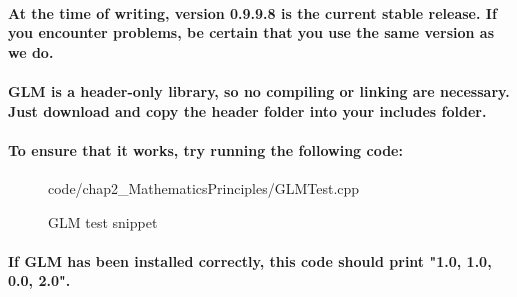 \paragraph{
    At the time of writing, version 0.9.9.8 is the current stable release. If you encounter problems, be certain that you use the same version as we do.
}

\paragraph{
    GLM is a header-only library, so no compiling or linking are necessary. Just download and copy the header folder into your includes folder.
}

\paragraph{
    To ensure that it works, try running the following code:
}

\begin{frame}{}
    \begin{figure}[ht]
    \centering
    \colorbox{backgroundcolor}{
        \parbox{0.9\textwidth}{
            
            {code/chap2_MathematicsPrinciples/GLMTest.cpp}
        }
    }
    \caption{GLM test snippet}
    \label{fig:glm_snippet}
    \end{figure}
\end{frame}

\paragraph{
    If GLM has been installed correctly, this code should print "{1.0, 1.0, 0.0, 2.0}".
}
